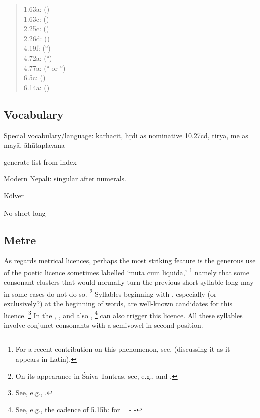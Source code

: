 \begin{quote}
 1.63a:  () \\
1.63c:  () \\
2.25c:  () \\
2.26d:  () \\
4.19f:  (°) \\
4.72a:  (°) \\
4.77a:  (° or °)
 \\
6.5c:  () \\
6.14a:  () \\
\end{quote}





\subsection{Vocabulary}




  Special vocabulary/language: karhacit, hṛdi as nominative 10.27cd,
  tirya, me as mayā, āhūtaplavana

  generate list from index

Modern Nepali: singular after numerals.

Kölver

No short-long


\subsection{Metre}\label{metre}
\label{muta}
As regards metrical licences, perhaps 
the most striking feature is the generous
use of the poetic licence sometimes labelled `muta cum liquida,'%
	\footnote{For a recent contribution on this phenomenon, see,
 	  (discussing it as it appears in Latin).}
namely that some consonant clusters that would 
normally turn the previous short  syllable
long  may in some cases do not do so.%
		\footnote{On its appearance in Śaiva Tantras,
							see, e.g.,  and
							.}
Syllables beginning with , 
especially (or exclusively?) at the beginning of words, are well-known
candidates for this licence.%
			\footnote{See, e.g., .} 
In the \VSS, , and also 
,%
	\footnote{See, e.g., the cadence of 5.15b:  for \ \shortsyllable\ 
								\shortsyllable - \shortsyllable -}
can also trigger this licence. 
All these syllables involve conjunct consonants with
a semivowel in second position.

